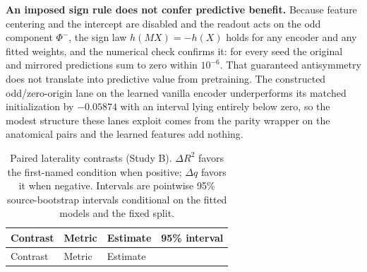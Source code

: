 \documentclass{article}
\begin{document}
\textbf{An imposed sign rule does not confer predictive benefit.}
Because feature centering and the intercept are disabled and the readout
acts on the odd component \(\Phi^-\), the sign law \(h(MX) = -h(X)\)
holds for any encoder and any fitted weights, and the numerical check
confirms it: for every seed the original and mirrored predictions sum to
zero within \(10^{-6}\). That guaranteed antisymmetry does not translate
into predictive value from pretraining. The constructed odd/zero-origin
lane on the learned vanilla encoder underperforms its matched
initialization by \(-0.05874\) with an interval lying entirely below
zero, so the modest structure these lanes exploit comes from the parity
wrapper on the anatomical pairs and the learned features add nothing.

\begin{longtable}[]{@{}
  >{\raggedright\arraybackslash}p{}
  >{\raggedright\arraybackslash}p{}
  >{\raggedleft\arraybackslash}p{}
  >{\raggedright\arraybackslash}p{}@{}}
\caption{Paired laterality contrasts (Study B). \(\Delta R^2\) favors
the first-named condition when positive; \(\Delta q\) favors it when
negative. Intervals are pointwise 95\% source-bootstrap intervals
conditional on the fitted models and the fixed split.}\tabularnewline
\toprule\noalign{}
\begin{minipage}[b]{\linewidth}\raggedright
Contrast
\end{minipage} & \begin{minipage}[b]{\linewidth}\raggedright
Metric
\end{minipage} & \begin{minipage}[b]{\linewidth}\raggedleft
Estimate
\end{minipage} & \begin{minipage}[b]{\linewidth}\raggedright
95\% interval
\end{minipage} \\
\midrule\noalign{}
\endfirsthead
\toprule\noalign{}
\begin{minipage}[b]{\linewidth}\raggedright
Contrast
\end{minipage} & \begin{minipage}[b]{\linewidth}\raggedright
Metric
\end{minipage} & \begin{minipage}[b]{\linewidth}\raggedleft
Estimate
\end{minipage} & \begin{minipage}[b]{\linewidth}\raggedright

\end{minipage}
\end{longtable}
\end{document}
